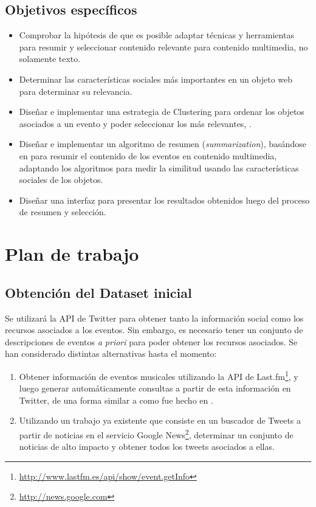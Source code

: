 \documentclass[11pt]{article}
\begin{document}
\subsection{Objetivos específicos}
\label{sec-4.2}

\begin{itemize}
\item Comprobar la hipótesis de que es posible adaptar técnicas y herramientas para resumir y seleccionar contenido relevante para contenido multimedia, no solamente texto.
\item Determinar las características sociales más importantes en un objeto web para determinar su relevancia.
\item Diseñar e implementar una estrategia de Clustering para ordenar los objetos asociados a un evento y poder seleccionar los más relevantes, .
\item Diseñar e implementar un algoritmo de resumen (\emph{summarization}), basándose en \cite{events} para resumir el contenido de los eventos en contenido multimedia, adaptando los algoritmos para medir la similitud usando las características sociales de los objetos.
\item Diseñar una interfaz para presentar los resultados obtenidos luego del proceso de resumen y selección.
\end{itemize}
\newpage
\section{Plan de trabajo}
\label{sec-5}



\subsection{Obtención del Dataset inicial}
\label{sec-5.1}


    Se utilizará la API de Twitter para obtener tanto la información social como los recursos asociados a los eventos. Sin embargo, es necesario tener un conjunto de descripciones de eventos \emph{a priori} para poder obtener los recursos asociados. Se han considerado distintas alternativas hasta el momento:

\begin{enumerate}
\item Obtener información de eventos musicales utilizando la API de Last.fm\footnote{\href{http://www.lastfm.es/api/show/event.getInfo}{http://www.lastfm.es/api/show/event.getInfo} }, y luego generar automáticamente consultas a partir de esta información en Twitter, de una forma similar a como fue hecho en \cite{concerts}.
\item Utilizando un trabajo ya existente que consiste en un buscador de Tweets a partir de noticias en el servicio Google News\footnote{\href{http://news.google.com}{http://news.google.com} }, determinar un conjunto de noticias de alto impacto y obtener todos los tweets asociados a ellas.
\end{enumerate}
\end{document}
